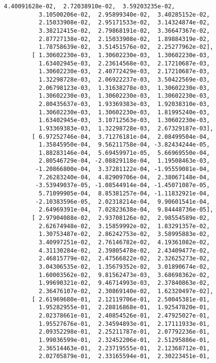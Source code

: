 \documentclass[11pt]{article}
\begin{document}
\begin{tcolorbox}[breakable, size=fbox, boxrule=.5pt, pad at break*=1mm, opacityfill=0]
\begin{Verbatim}[commandchars=\\\{\}]
          4.40091628e-02,  2.72038910e-02,  3.59203235e-02,
          3.10500206e-02,  2.95899340e-02,  3.40285152e-02,
          2.15033908e-02,  2.95171533e-02,  3.14324874e-02,
          3.38212415e-02,  2.79868191e-02,  3.36647367e-02,
          2.87727138e-02,  2.15033908e-02,  1.89884319e-02,
          1.78758639e-02,  3.51451576e-02,  2.25277962e-02],
        [ 1.30602230e-03,  1.30602230e-03,  1.30602230e-03,
          1.63402945e-03,  2.23614568e-03,  2.17210687e-03,
          1.30602230e-03,  2.40772429e-03,  2.17210687e-03,
          1.32298728e-03,  2.06922237e-03,  3.50422569e-03,
          2.06798123e-03,  1.31638278e-03,  1.30602230e-03,
          1.30602230e-03,  1.30602230e-03,  1.30602230e-03,
          2.80435637e-03,  1.93369383e-03,  1.92038310e-03,
          1.30602230e-03,  1.30602230e-03,  1.81995240e-03,
          1.63402945e-03,  3.10712563e-03,  1.30602230e-03,
          1.93369383e-03,  1.32298728e-03,  2.67329187e-03],
        [ 6.97252746e-04,  3.71276181e-04,  2.08499504e-04,
          1.35845950e-04,  9.56211758e-04, -3.82434244e-05,
          1.88283146e-04,  5.69459971e-05,  5.66969550e-04,
          2.80546729e-04, -2.08829118e-04,  1.19508463e-03,
         -1.20866800e-04,  3.37281122e-04, -1.95559081e-04,
          7.26283240e-04,  4.82909706e-04,  2.38067148e-04,
         -3.53949037e-05, -1.08544914e-04, -1.45071087e-05,
          5.71099905e-04,  8.85381257e-04, -1.11832921e-04,
         -2.10383596e-05,  2.02318214e-04,  9.90601541e-04,
          2.64969391e-04,  7.02823638e-04,  9.84448736e-05],
        [ 2.97904088e-02,  2.93708126e-02,  2.98554589e-02,
          2.62674948e-02,  3.15859992e-02,  1.83291357e-02,
          1.30753487e-02,  2.86242753e-02,  3.58995883e-02,
          3.40997251e-02,  2.76146782e-02,  4.19361082e-02,
          4.31130284e-02,  2.39805478e-02,  2.43409477e-02,
          2.46815779e-02,  2.47566822e-02,  2.32625273e-02,
          3.04306535e-02,  1.35679352e-02,  3.01890674e-02,
          1.60003562e-02,  9.81562473e-03,  3.68698362e-02,
          1.99690321e-02,  9.46714993e-03,  2.37840863e-02,
          2.36476107e-02,  2.30869140e-02,  1.62320497e-02],
        [ 2.61969680e-01,  2.12119706e-01,  2.50045381e-01,
          1.95282955e-01,  2.28816868e-01,  1.92547820e-01,
          2.02378661e-01,  2.40854526e-01,  2.47925027e-01,
          1.95527676e-01,  2.34594893e-01,  2.17111933e-01,
          2.09352298e-01,  2.25211787e-01,  2.07792236e-01,
          1.99036599e-01,  2.32452206e-01,  2.51295886e-01,
          2.36514463e-01,  2.23719555e-01,  2.12368712e-01,
          2.02705879e-01,  2.33165594e-01,  2.30223451e-01,

\end{Verbatim}
\end{tcolorbox}
\end{document}
